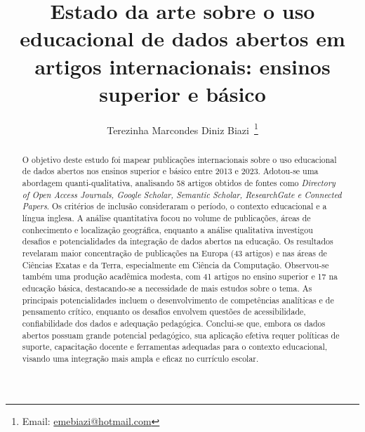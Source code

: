 \documentclass[portuguese]{textolivre}
\title{Estado da arte sobre o uso educacional de dados abertos em artigos internacionais: ensinos superior e básico}
\author[1,2]{Terezinha Marcondes Diniz Biazi~\orcid{0000-0001-8599-8786}\thanks{Email: \href{mailto:emebiazi@hotmail.com}{emebiazi@hotmail.com}}}
\affil[1]{Universidade Estadual de Campinas, Campinas, SP, Brasil.}
\affil[2]{Universidade Estadual do Centro-Oeste, Guarapuava, PR, Brasil.}
\begin{document}
\maketitle
\begin{polyabstract}
\begin{abstract}
O objetivo deste estudo foi mapear publicações internacionais sobre o uso educacional de dados abertos nos ensinos superior e básico entre 2013 e 2023. Adotou-se uma abordagem quanti-qualitativa, analisando 58 artigos obtidos de fontes como \textit{Directory of Open Access Journals, Google Scholar, Semantic Scholar, ResearchGate e Connected Papers}. Os critérios de inclusão consideraram o período, o contexto educacional e a língua inglesa. A análise quantitativa focou no volume de publicações, áreas de conhecimento e localização geográfica, enquanto a análise qualitativa investigou desafios e potencialidades da integração de dados abertos na educação. Os resultados revelaram maior concentração de publicações na Europa (43 artigos) e nas áreas de Ciências Exatas e da Terra, especialmente em Ciência da Computação. Observou-se também uma produção acadêmica modesta, com 41 artigos no ensino superior e 17 na educação básica, destacando-se a necessidade de mais estudos sobre o tema. As principais potencialidades incluem o desenvolvimento de competências analíticas e de pensamento crítico, enquanto os desafios envolvem questões de acessibilidade, confiabilidade dos dados e adequação pedagógica. Conclui-se que, embora os dados abertos possuam grande potencial pedagógico, sua aplicação efetiva requer políticas de suporte, capacitação docente e ferramentas adequadas para o contexto educacional, visando uma integração mais ampla e eficaz no currículo escolar.

\end{abstract}


\end{polyabstract}
\end{document}
